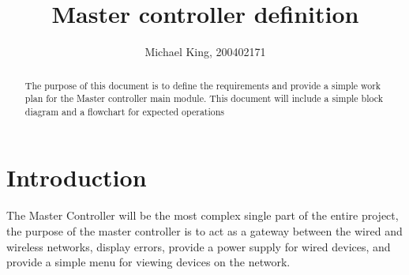 \documentclass{article}
\begin{document}
	\begin{titlepage}
    	\title{Master controller definition}
    	\author{Michael King, 200402171}
    	\maketitle
    	\thispagestyle{empty}
	\end{titlepage}
    \begin{abstract}
        The purpose of this document is to define the requirements and provide a
         simple work plan for the Master controller main module. This document 
         will include a simple block diagram and a flowchart for expected 
         operations
         \newpage
	\end{abstract}
    \section{Introduction}
        The Master Controller will be the most complex single part of the entire
         project, the purpose of the master controller is to act as a gateway
         between the wired and wireless networks, display errors, provide a
         power supply for wired devices, and provide a simple menu for viewing 
         devices on the network.
     
     \section{}
\end{document}
